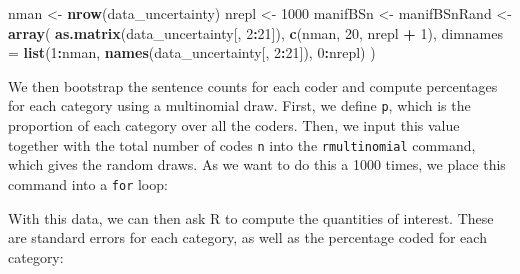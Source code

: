 \documentclass[
]{book}
\newenvironment{Shaded}{\begin{snugshade}}{\end{snugshade}}
\newcommand{\AttributeTok}[1]{\textcolor[rgb]{0.13,0.29,0.53}{#1}}
\newcommand{\ControlFlowTok}[1]{\textcolor[rgb]{0.13,0.29,0.53}{\textbf{#1}}}
\newcommand{\DecValTok}[1]{\textcolor[rgb]{0.00,0.00,0.81}{#1}}
\newcommand{\FunctionTok}[1]{\textcolor[rgb]{0.13,0.29,0.53}{\textbf{#1}}}
\newcommand{\NormalTok}[1]{#1}
\newcommand{\OtherTok}[1]{\textcolor[rgb]{0.56,0.35,0.01}{#1}}
\newcommand{\SpecialCharTok}[1]{\textcolor[rgb]{0.81,0.36,0.00}{\textbf{#1}}}
\begin{document}
\begin{Shaded}
\begin{Highlighting}[]
\NormalTok{nman }\OtherTok{\textless{}{-}} \FunctionTok{nrow}\NormalTok{(data\_uncertainty)}
\NormalTok{nrepl }\OtherTok{\textless{}{-}} \DecValTok{1000}
\NormalTok{manifBSn }\OtherTok{\textless{}{-}}
\NormalTok{  manifBSnRand }\OtherTok{\textless{}{-}} \FunctionTok{array}\NormalTok{(}
    \FunctionTok{as.matrix}\NormalTok{(data\_uncertainty[, }\DecValTok{2}\SpecialCharTok{:}\DecValTok{21}\NormalTok{]),}
    \FunctionTok{c}\NormalTok{(nman, }\DecValTok{20}\NormalTok{, nrepl }\SpecialCharTok{+} \DecValTok{1}\NormalTok{),}
    \AttributeTok{dimnames =} \FunctionTok{list}\NormalTok{(}\DecValTok{1}\SpecialCharTok{:}\NormalTok{nman, }\FunctionTok{names}\NormalTok{(data\_uncertainty[, }\DecValTok{2}\SpecialCharTok{:}\DecValTok{21}\NormalTok{]),}
                    \DecValTok{0}\SpecialCharTok{:}\NormalTok{nrepl)}
\NormalTok{  )}
\end{Highlighting}
\end{Shaded}

We then bootstrap the sentence counts for each coder and compute percentages for each category using a multinomial draw. First, we define \texttt{p}, which is the proportion of each category over all the coders. Then, we input this value together with the total number of codes \texttt{n} into the \texttt{rmultinomial} command, which gives the random draws. As we want to do this a 1000 times, we place this command into a \texttt{for} loop:

\begin{Shaded}
\end{Shaded}

With this data, we can then ask R to compute the quantities of interest. These are standard errors for each category, as well as the percentage coded for each category:
\end{document}
